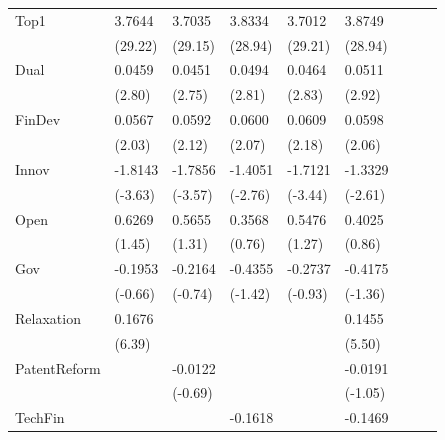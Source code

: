 \begin{table}[htbp]
\begin{tabularx}{\textwidth}{lYYYYYYYY@{}}
Top1            &   3.7644\sym{***}&   3.7035\sym{***}&   3.8334\sym{***}&   3.7012\sym{***}&   3.8749\sym{***}\\
                &  (29.22)         &  (29.15)         &  (28.94)         &  (29.21)         &  (28.94)         \\
Dual            &   0.0459\sym{***}&   0.0451\sym{***}&   0.0494\sym{***}&   0.0464\sym{***}&   0.0511\sym{***}\\
                &   (2.80)         &   (2.75)         &   (2.81)         &   (2.83)         &   (2.92)         \\
FinDev          &   0.0567\sym{**} &   0.0592\sym{**} &   0.0600\sym{**} &   0.0609\sym{**} &   0.0598\sym{**} \\
                &   (2.03)         &   (2.12)         &   (2.07)         &   (2.18)         &   (2.06)         \\
Innov           &  -1.8143\sym{***}&  -1.7856\sym{***}&  -1.4051\sym{***}&  -1.7121\sym{***}&  -1.3329\sym{***}\\
                &  (-3.63)         &  (-3.57)         &  (-2.76)         &  (-3.44)         &  (-2.61)         \\
Open            &   0.6269         &   0.5655         &   0.3568         &   0.5476         &   0.4025         \\
                &   (1.45)         &   (1.31)         &   (0.76)         &   (1.27)         &   (0.86)         \\
Gov             &  -0.1953         &  -0.2164         &  -0.4355         &  -0.2737         &  -0.4175         \\
                &  (-0.66)         &  (-0.74)         &  (-1.42)         &  (-0.93)         &  (-1.36)         \\
Relaxation      &   0.1676\sym{***}&                  &                  &                  &   0.1455\sym{***}\\
                &   (6.39)         &                  &                  &                  &   (5.50)         \\
PatentReform    &                  &  -0.0122         &                  &                  &  -0.0191         \\
                &                  &  (-0.69)         &                  &                  &  (-1.05)         \\
TechFin         &                  &                  &  -0.1618\sym{***}&                  &  -0.1469\sym{***}\\

\end{tabularx}
\end{table}
